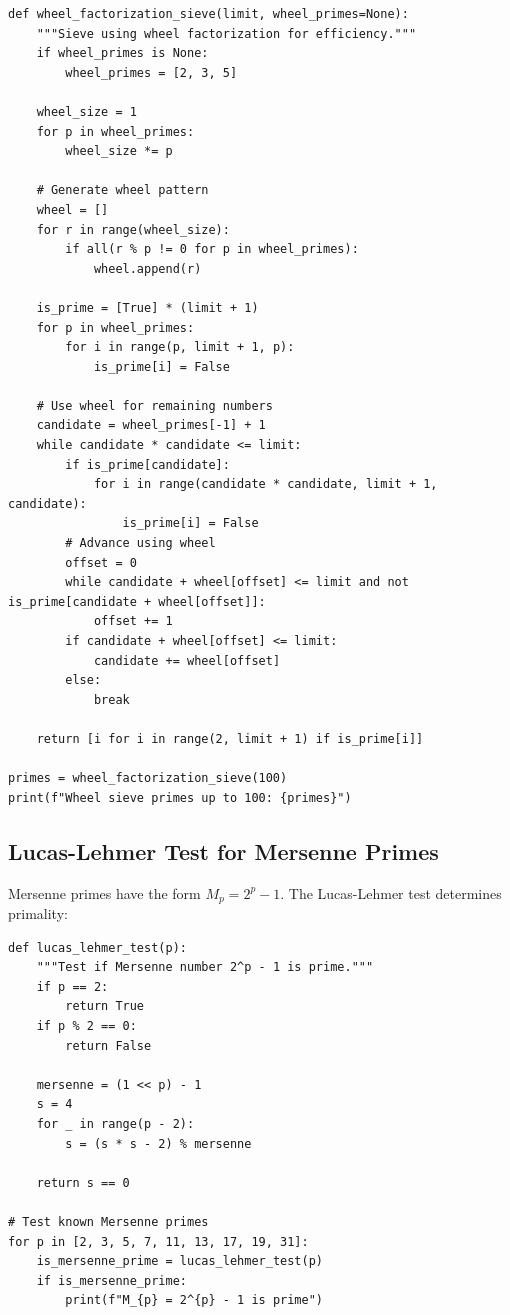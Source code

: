 \begin{lstlisting}[caption={Wheel factorization}, label=lst:wheel]
def wheel_factorization_sieve(limit, wheel_primes=None):
    """Sieve using wheel factorization for efficiency."""
    if wheel_primes is None:
        wheel_primes = [2, 3, 5]
    
    wheel_size = 1
    for p in wheel_primes:
        wheel_size *= p
    
    # Generate wheel pattern
    wheel = []
    for r in range(wheel_size):
        if all(r % p != 0 for p in wheel_primes):
            wheel.append(r)
    
    is_prime = [True] * (limit + 1)
    for p in wheel_primes:
        for i in range(p, limit + 1, p):
            is_prime[i] = False
    
    # Use wheel for remaining numbers
    candidate = wheel_primes[-1] + 1
    while candidate * candidate <= limit:
        if is_prime[candidate]:
            for i in range(candidate * candidate, limit + 1, candidate):
                is_prime[i] = False
        # Advance using wheel
        offset = 0
        while candidate + wheel[offset] <= limit and not is_prime[candidate + wheel[offset]]:
            offset += 1
        if candidate + wheel[offset] <= limit:
            candidate += wheel[offset]
        else:
            break
    
    return [i for i in range(2, limit + 1) if is_prime[i]]

primes = wheel_factorization_sieve(100)
print(f"Wheel sieve primes up to 100: {primes}")
\end{lstlisting}

\subsection{Lucas-Lehmer Test for Mersenne Primes}

Mersenne primes have the form $M_p = 2^p - 1$. The Lucas-Lehmer test determines primality:

\begin{lstlisting}[caption={Lucas-Lehmer test}, label=lst:lucas_lehmer]
def lucas_lehmer_test(p):
    """Test if Mersenne number 2^p - 1 is prime."""
    if p == 2:
        return True
    if p % 2 == 0:
        return False
    
    mersenne = (1 << p) - 1
    s = 4
    for _ in range(p - 2):
        s = (s * s - 2) % mersenne
    
    return s == 0

# Test known Mersenne primes
for p in [2, 3, 5, 7, 11, 13, 17, 19, 31]:
    is_mersenne_prime = lucas_lehmer_test(p)
    if is_mersenne_prime:
        print(f"M_{p} = 2^{p} - 1 is prime")
\end{lstlisting}

